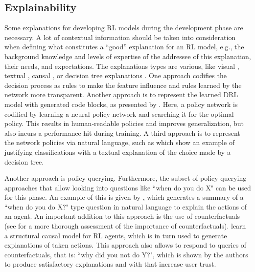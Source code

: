 \documentclass[twoside,11pt]{article}
\begin{document}
\subsection{Explainability}
Some explanations for developing RL models during the development phase are necessary. A lot of contextual information should be taken into consideration when defining what constitutes a ``good” explanation for an RL model, e.g., the background knowledge and levels of expertise of the addressee of this explanation, their needs, and expectations. The explanations types are various, like visual \citep{DBLP:journals/corr/abs-1912-12191,DBLP:journals/corr/abs-1912-05743}, textual \citep{HayesShah:2017:AutonomousPolicyExplanation,fukuchi2017autonomous}, causal \citep{MadumalEtAl:2020:CausalRLCFs,Madumal:2020:DistalEF}, or decision tree explanations \citep{bastani2018verifiable}. One approach \citet{LiuEtAl:2018:LinearModelUTrees} codifies the decision process as rules to make the feature influence and rules learned by the network more transparent. Another approach is to represent the learned DRL model with generated code blocks, as presented by \citet{VermaEtAl:2018:ProgrammaticallyInterpretableRL}. Here, a policy network is codified by learning a neural policy network and searching it for the optimal policy. This results in human-readable policies and improves generalization, but also incurs a performance hit during training. A third approach is to represent the network policies via natural language, such as \citet{AlonsoEtAl:2018:xAINLBeerClassifier} which show an example of justifying classifications with a textual explanation of the choice made by a decision tree.

Another approach is policy querying.
Furthermore, the subset of policy querying approaches that allow looking into questions like ``when do you do X" can be used for this phase.
An example of this is given by \citet{HayesShah:2017:AutonomousPolicyExplanation}, which generates a summary of a ``when do you do X?" type question in natural language to explain the actions of an agent. An important addition to this approach is the use of counterfactuals (see \citet{EvansEtAl:2021:ExplainabilityParadox} for a more thorough assessment of the importance of counterfactuals). \citet{MadumalEtAl:2020:CausalRLCFs} learn a structural causal model for RL agents, which is in turn used to generate explanations of taken actions. This approach also allows to respond to queries of counterfactuals, that is: ``why did you not do Y?", which is shown by the authors to produce satisfactory explanations and with that increase user trust.
\end{document}
